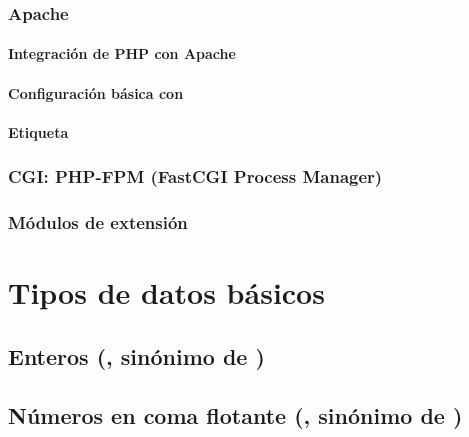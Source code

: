 \documentclass[a4paper,11pt,spanish]{sphinxmanual}
\begin{document}
\subsubsection{Apache}
\label{\detokenize{php:apache}}

\paragraph{Integración de PHP con Apache}
\label{\detokenize{php:integracion-de-php-con-apache}}

\paragraph{Configuración básica con }
\label{\detokenize{php:configuracion-basica-con-php-ini}}

\paragraph{Etiqueta }
\label{\detokenize{php:etiqueta}}

\subsubsection{CGI: PHP-FPM (FastCGI Process Manager)}
\label{\detokenize{php:cgi-php-fpm-fastcgi-process-manager}}

\subsubsection{Módulos de extensión}
\label{\detokenize{php:modulos-de-extension}}

\section{Tipos de datos básicos}
\label{\detokenize{php:tipos-de-datos-basicos}}

\subsection{Enteros (, sinónimo de )}
\label{\detokenize{php:enteros-int-sinonimo-de-integer}}

\subsection{Números en coma flotante (, sinónimo de )}
\label{\detokenize{php:numeros-en-coma-flotante-float-sinonimo-de-double}}
\end{document}
